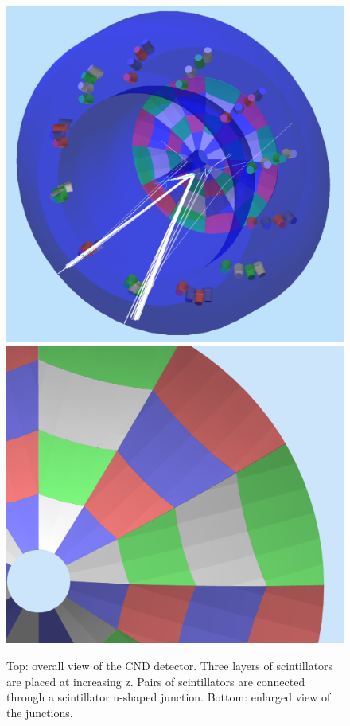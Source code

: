 \begin{figure}
	\centering
	\includegraphics[width=0.95\columnwidth,keepaspectratio]{img/htccGeometry.png}
	\includegraphics[width=0.95\columnwidth,keepaspectratio]{img/htccDetail.png}
	\caption{Top: overall view of the CND detector. Three layers of scintillators are placed at increasing z. Pairs of scintillators
            are connected through a scintillator u-shaped junction. Bottom: enlarged view of the junctions. }
	\label{fig:htccGeometry}
\end{figure}



